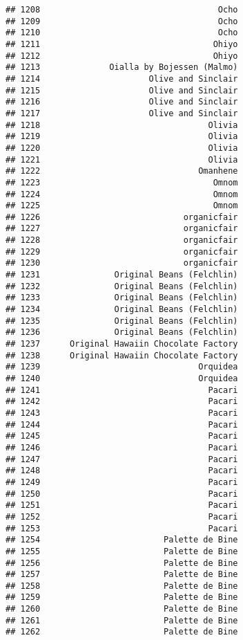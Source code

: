 \documentclass[
]{article}
\begin{document}
\begin{verbatim}
## 1208                                    Ocho
## 1209                                    Ocho
## 1210                                    Ocho
## 1211                                   Ohiyo
## 1212                                   Ohiyo
## 1213              Oialla by Bojessen (Malmo)
## 1214                      Olive and Sinclair
## 1215                      Olive and Sinclair
## 1216                      Olive and Sinclair
## 1217                      Olive and Sinclair
## 1218                                  Olivia
## 1219                                  Olivia
## 1220                                  Olivia
## 1221                                  Olivia
## 1222                                Omanhene
## 1223                                   Omnom
## 1224                                   Omnom
## 1225                                   Omnom
## 1226                             organicfair
## 1227                             organicfair
## 1228                             organicfair
## 1229                             organicfair
## 1230                             organicfair
## 1231               Original Beans (Felchlin)
## 1232               Original Beans (Felchlin)
## 1233               Original Beans (Felchlin)
## 1234               Original Beans (Felchlin)
## 1235               Original Beans (Felchlin)
## 1236               Original Beans (Felchlin)
## 1237      Original Hawaiin Chocolate Factory
## 1238      Original Hawaiin Chocolate Factory
## 1239                                Orquidea
## 1240                                Orquidea
## 1241                                  Pacari
## 1242                                  Pacari
## 1243                                  Pacari
## 1244                                  Pacari
## 1245                                  Pacari
## 1246                                  Pacari
## 1247                                  Pacari
## 1248                                  Pacari
## 1249                                  Pacari
## 1250                                  Pacari
## 1251                                  Pacari
## 1252                                  Pacari
## 1253                                  Pacari
## 1254                         Palette de Bine
## 1255                         Palette de Bine
## 1256                         Palette de Bine
## 1257                         Palette de Bine
## 1258                         Palette de Bine
## 1259                         Palette de Bine
## 1260                         Palette de Bine
## 1261                         Palette de Bine
## 1262                         Palette de Bine

\end{verbatim}
\end{document}
